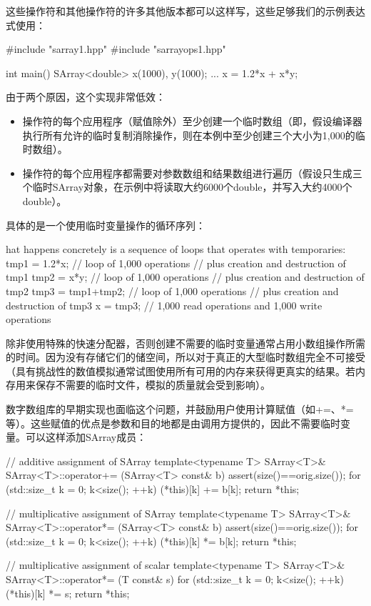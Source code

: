这些操作符和其他操作符的许多其他版本都可以这样写，这些足够我们的示例表达式使用：

\begin{cpp}
#include "sarray1.hpp"
#include "sarrayops1.hpp"

int main() {
	SArray<double> x(1000), y(1000);
	...
	x = 1.2*x + x*y;
}
\end{cpp}

由于两个原因，这个实现非常低效：

\begin{itemize}
\item 
操作符的每个应用程序（赋值除外）至少创建一个临时数组（即，假设编译器执行所有允许的临时复制消除操作，则在本例中至少创建三个大小为1,000的临时数组）。

\item 
操作符的每个应用程序都需要对参数数组和结果数组进行遍历（假设只生成三个临时SArray对象，在示例中将读取大约6000个double，并写入大约4000个double）。
\end{itemize}

具体的是一个使用临时变量操作的循环序列：

\begin{cpp}
hat happens concretely is a sequence of loops that operates with temporaries:
tmp1 = 1.2*x; // loop of 1,000 operations
			  // plus creation and destruction of tmp1
tmp2 = x*y; // loop of 1,000 operations
		  // plus creation and destruction of tmp2
tmp3 = tmp1+tmp2; // loop of 1,000 operations
				  // plus creation and destruction of tmp3
x = tmp3; // 1,000 read operations and 1,000 write operations
\end{cpp}

除非使用特殊的快速分配器，否则创建不需要的临时变量通常占用小数组操作所需的时间。因为没有存储它们的储空间，所以对于真正的大型临时数组完全不可接受（具有挑战性的数值模拟通常试图使用所有可用的内存来获得更真实的结果。若内存用来保存不需要的临时文件，模拟的质量就会受到影响）。

数字数组库的早期实现也面临这个问题，并鼓励用户使用计算赋值（如+=、*=等）。这些赋值的优点是参数和目的地都是由调用方提供的，因此不需要临时变量。可以这样添加SArray成员：

\begin{cpp}
// additive assignment of SArray
template<typename T>
SArray<T>& SArray<T>::operator+= (SArray<T> const& b) {
	assert(size()==orig.size());
	for (std::size_t k = 0; k<size(); ++k) {
		(*this)[k] += b[k];
	}
	return *this;
}

// multiplicative assignment of SArray
template<typename T>
SArray<T>& SArray<T>::operator*= (SArray<T> const& b) {
	assert(size()==orig.size());
	for (std::size_t k = 0; k<size(); ++k) {
		(*this)[k] *= b[k];
	}
	return *this;
}

// multiplicative assignment of scalar
template<typename T>
SArray<T>& SArray<T>::operator*= (T const& s) {
	for (std::size_t k = 0; k<size(); ++k) {
		(*this)[k] *= s;
	}
	return *this;
}
\end{cpp}


